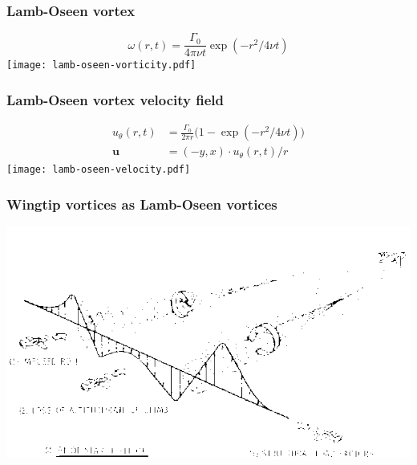 \documentclass[12pt,english,dvipsnames]{beamer}
\renewcommand{\vec}{\mathbf}
\begin{document}
  \begin{frame}
    \frametitle{Lamb-Oseen vortex}
    \begin{equation}
      ω(r, t) = \frac{Γ_0}{4πνt} \exp(-r^2/4νt)
    \end{equation}
    \texttt{[image: lamb-oseen-vorticity.pdf]}
  \end{frame}

  \begin{frame}
    \frametitle{Lamb-Oseen vortex velocity field}
    \begin{align}
      u_\theta(r, t) &= \frac{Γ_0}{2πr} \bigl(1 - \exp(-r^2/4νt)\bigr) \\
      \vec{u} &= (-y, x)\cdot u_\theta(r, t)/r
    \end{align}
    \texttt{[image: lamb-oseen-velocity.pdf]}
  \end{frame}

  \begin{frame}
    \frametitle{Wingtip vortices as Lamb-Oseen vortices}
    \includegraphics[scale=.45]{wingtip-vortices.png}
  \end{frame}
\end{document}
